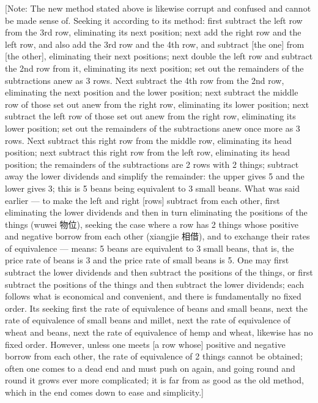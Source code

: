 \documentclass[11pt]{article}
\newenvironment{uniten}{\par\small\color{black!85}}{\par\medskip}
\begin{document}
\begin{uniten}[Note: The new method stated above is likewise corrupt and confused and cannot be made sense of. Seeking it according to its method: first subtract the left row from the 3rd row, eliminating its next position; next add the right row and the left row, and also add the 3rd row and the 4th row, and subtract [the one] from [the other], eliminating their next positions; next double the left row and subtract the 2nd row from it, eliminating its next position; set out the remainders of the subtractions anew as 3 rows. Next subtract the 4th row from the 2nd row, eliminating the next position and the lower position; next subtract the middle row of those set out anew from the right row, eliminating its lower position; next subtract the left row of those set out anew from the right row, eliminating its lower position; set out the remainders of the subtractions anew once more as 3 rows. Next subtract this right row from the middle row, eliminating its head position; next subtract this right row from the left row, eliminating its head position; the remainders of the subtractions are 2 rows with 2 things; subtract away the lower dividends and simplify the remainder: the upper gives 5 and the lower gives 3; this is 5 beans being equivalent to 3 small beans. What was said earlier — to make the left and right [rows] subtract from each other, first eliminating the lower dividends and then in turn eliminating the positions of the things (wuwei 物位), seeking the case where a row has 2 things whose positive and negative borrow from each other (xiangjie 相借), and to exchange their rates of equivalence — means: 5 beans are equivalent to 3 small beans, that is, the price rate of beans is 3 and the price rate of small beans is 5. One may first subtract the lower dividends and then subtract the positions of the things, or first subtract the positions of the things and then subtract the lower dividends; each follows what is economical and convenient, and there is fundamentally no fixed order. Its seeking first the rate of equivalence of beans and small beans, next the rate of equivalence of small beans and millet, next the rate of equivalence of wheat and beans, next the rate of equivalence of hemp and wheat, likewise has no fixed order. However, unless one meets [a row whose] positive and negative borrow from each other, the rate of equivalence of 2 things cannot be obtained; often one comes to a dead end and must push on again, and going round and round it grows ever more complicated; it is far from as good as the old method, which in the end comes down to ease and simplicity.]\end{uniten}
\end{document}
